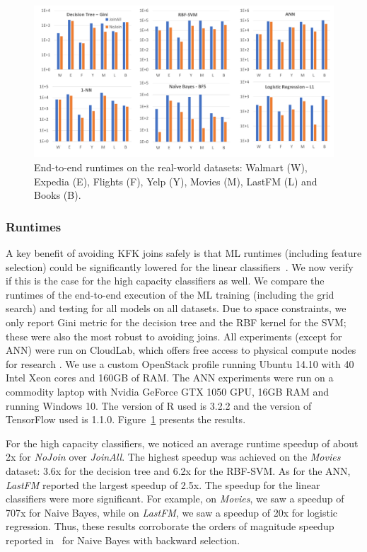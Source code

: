 \documentclass{vldb}
\begin{document}

\begin{figure}[t]
\centering
\includegraphics[width=\linewidth]{histogram.pdf}
\caption{End-to-end runtimes on the real-world datasets: Walmart (W), Expedia (E), Flights (F), Yelp (Y), Movies (M), LastFM (L) and Books (B).}
\label{Figure:runtime}
\end{figure}

\subsubsection*{Runtimes}
A key benefit of avoiding KFK joins safely is that ML runtimes (including feature selection) could be significantly lowered for the linear classifiers~\cite{hamlet}.
We now verify if this is the case for the high capacity classifiers as well. We compare the runtimes of the end-to-end execution of the ML training (including the 
grid search) and testing for all models on all datasets.
Due to space constraints, we only report Gini metric for the decision tree and the RBF kernel for the SVM; these were also the most robust to avoiding joins.
All experiments (except for ANN) were run on CloudLab, which offers free access to physical compute nodes for research \cite{ricci2014introducing}. We use a custom OpenStack profile running Ubuntu 14.10 with 40 Intel Xeon cores and 160GB of RAM.
The ANN experiments were run on a commodity laptop with Nvidia GeForce GTX 1050 GPU, 16GB RAM and running Windows 10. The version of R used is 3.2.2 and the version of TensorFlow used is 1.1.0.
Figure~\ref{Figure:runtime} presents the results.

For the high capacity classifiers, we noticed an average runtime speedup of about 2x for \textit{NoJoin} over \textit{JoinAll}.  The highest speedup was 
achieved on the \textit{Movies} dataset: 3.6x for the decision tree and 6.2x for the RBF-SVM. As for the ANN, \textit{LastFM} reported the 
largest speedup of 2.5x. 
The speedup for the linear classifiers were more significant. For example, on \textit{Movies}, we saw a speedup of 707x for Naive Bayes, while on 
\textit{LastFM}, we saw a speedup of 20x for logistic regression. Thus, these results corroborate the orders of magnitude speedup reported in~\cite{hamlet} 
for Naive Bayes with backward selection.
\end{document}
